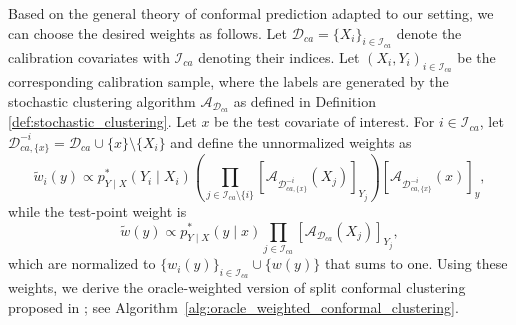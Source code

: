 \documentclass[11pt,letterpaper]{article}
\theoremstyle{definition}
\newcommand{\cA}{\mathcal{A}}
\newcommand{\cD}{\mathcal{D}}
\newcommand{\cI}{\mathcal{I}}
\begin{document}
Based on the general theory of conformal prediction adapted to our setting, we can choose the desired weights as follows. 
Let \(\cD_{ca}=\{X_i\}_{i \in \cI_{ca}}\) denote the calibration covariates with $\cI_{ca}$ denoting their indices. Let \((X_i,Y_i)_{i \in \cI_{ca}}\) be the corresponding calibration sample, where the labels are generated by the stochastic clustering algorithm $\cA_{\cD_{ca}}$ as defined in Definition \ref{def:stochastic_clustering}. Let $x$ be the test covariate of interest. For $i \in \cI_{ca}$, let $\cD_{ca, \{x\}}^{-i} = \cD_{ca} \cup \{x\} \setminus \{X_i\}$ and define the unnormalized weights as
\begin{equation}
    \label{eq:weight_calibration} 
    \tilde w_i(y)
    \propto
    p_{Y\mid X}^\ast\left(Y_i \mid X_i\right)
    \left(
    \prod_{j \in \cI_{ca} \setminus \{i\}}
    \left[\mathcal A_{\cD_{ca, \{x\}}^{-i}}(X_j)\right]_{Y_j}
    \right)
    \left[\mathcal A_{\cD_{ca, \{x\}}^{-i}}(x)\right]_{y},
\end{equation}
while the test-point weight is
\begin{equation}
    \label{eq:weight_test}
    \tilde w(y)
    \propto
    p_{Y\mid X}^\ast(y\mid x)
    \prod_{j \in \cI_{ca}}
    \left[\mathcal A_{\cD_{ca}}(X_j)\right]_{Y_j},
\end{equation}
which are normalized to \(\{w_i(y)\}_{i \in \cI_{ca}} \cup \{w(y)\}\) that sums to one. Using these weights, we derive the oracle-weighted version of split conformal clustering proposed in \cite{hur2026inference}; see Algorithm~\ref{alg:oracle_weighted_conformal_clustering}.
\end{document}
